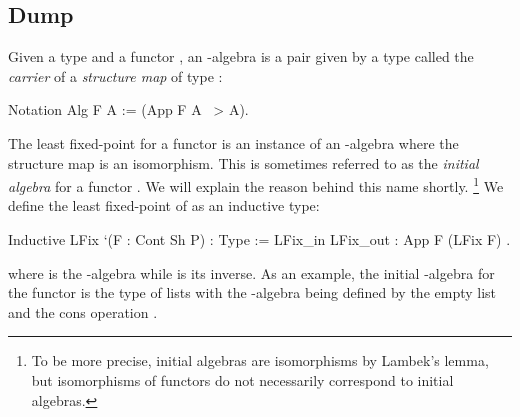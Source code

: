 \documentclass{llncs}
\begin{document}
\subsection{Dump}
Given a type  and a functor , an -algebra is a pair given
by a type  called the \emph{carrier} of a \emph{structure map} of type
:
\begin{coqcode}
Notation Alg F A := (App F A ~> A).
\end{coqcode}
The least fixed-point for a functor  is an instance of an -algebra
where the structure map is an isomorphism. This is sometimes referred to as the
\emph{initial algebra} for a functor . We will explain the reason behind
this name shortly. \footnote[1]{To be more precise, initial algebras are
isomorphisms by Lambek's lemma, but isomorphisms of functors do not necessarily
correspond to initial algebras.}  We define the least fixed-point of  as
an inductive type:
\begin{coqcode}
Inductive LFix `(F : Cont Sh P) : Type := LFix_in { LFix_out : App F (LFix F) }.
\end{coqcode}
where  is the -algebra while  is its inverse.
As an example, the initial -algebra for the
functor  is the type of lists with the -algebra
being defined by the empty list  and the cons
operation .
\end{document}
